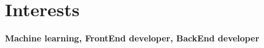 \documentclass[a4paper,10pt]{article}
\newcommand{\MySkip}{
\vskip12pt
}
\begin{document}
\begin{adjustbox}{valign=t}
\begin{minipage}{0.6\textwidth}
\MySkip
\section*{Interests}
\begin{description}
	\raggedright
	\item \textbf{Machine learning, FrontEnd developer, BackEnd developer}
\end{description}

\end{minipage}
\end{adjustbox}
\end{document}
